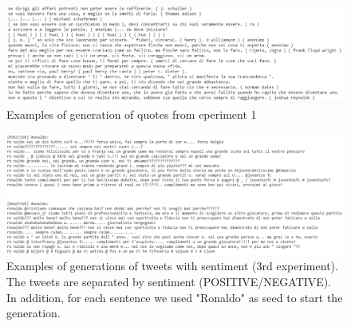\documentclass[10pt,twocolumn,letterpaper]{article}
\begin{document}
\begin{figure}[ht]
\centering
\includegraphics[width=\textwidth]{quotes.png}
\caption{Examples of generation of quotes from eperiment 1}
\end{figure}


\begin{figure}[ht]
\centering
\includegraphics[width=\textwidth]{tweets.png}
\caption{Examples of generations of tweets with sentiment (3rd experiment). The tweets are separated by sentiment (POSITIVE/NEGATIVE).
In addition, for each sentence we used "Ronaldo" as seed to start the generation.
}
\label{fig:tweets}
\end{figure}
\clearpage
\mbox{~}
\end{document}
